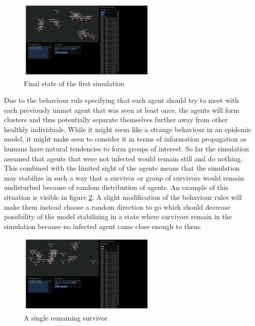 \begin{figure}[h]
    \centering
    \includegraphics[width=0.6\textwidth]{images/chapter2/sir_end_state.png}
    \caption{Final state of the first simulation}\label{fig:sir_end_state.png}
\end{figure}

Due to the behaviour rule specifying that each agent should try to meet with each previously unmet agent that was seen at least once, the agents will form clusters and thus potentially separate themselves further away from other healthly individuals.
While it might seem like a strange behaviour in an epidemic model, it might make seen to consider it in terms of information propagation as humans have natural tendencies to form groups of interest.
So far the simulation assumed that agents that were not infected would remain still and do nothing.
This combined with the limited sight of the agents means that the simulation may stabilize in such a way that a survivor or group of survivors would remain undisturbed because of random distribution of agents.
An example of this situation is visible in figure \ref{fig:sir_stable_survivor.png}.
A slight modification of the behaviour rules will make them instead choose a random direction to go which should decrease possibility of the model stabilizing in a state where survivors remain in the simulation because no infected agent came close enough to them.

\begin{figure}[h]
    \centering
    \includegraphics[width=0.6\textwidth]{images/chapter2/sir_stable_survivor.png}
    \caption{A single remaining survivor}\label{fig:sir_stable_survivor.png}
\end{figure}

